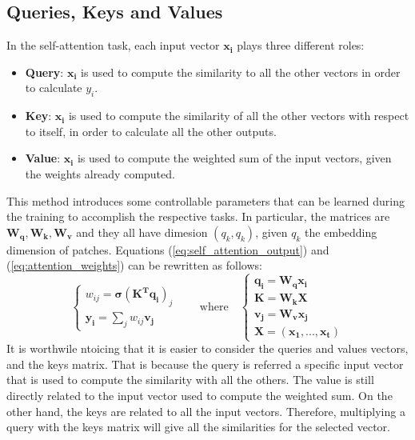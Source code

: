 \subsection{Queries, Keys and Values}
In the self-attention task, each input vector $\boldsymbol{x_i}$ plays three 
different roles:
\begin{itemize}
    \item \textbf{Query}: $\boldsymbol{x_i}$ is used to compute the similarity to all the other 
    vectors in order to calculate $y_i$.
    \item \textbf{Key}: $\boldsymbol{x_i}$ is used to compute the similarity of 
    all the other vectors with respect to itself, in order to calculate all the 
    other outputs.
    \item \textbf{Value}: $\boldsymbol{x_i}$ is used to compute the weighted sum 
    of the input vectors, given the weights already computed.
\end{itemize}
This method introduces some controllable parameters that can be learned during 
the training to accomplish the respective tasks. In particular, the matrices 
are $\boldsymbol{W_q}, \boldsymbol{W_k}, \boldsymbol{W_v}$ and they all have 
dimesion $(q_k, q_k)$, given $q_k$ the embedding dimension of patches.
Equations (\ref{eq:self_attention_output}) and (\ref{eq:attention_weights}) can 
be rewritten as follows:
\begin{equation}
\begin{cases}
    w_{ij} = \boldsymbol{\sigma}(\boldsymbol{K^T q_i})_j \\
    \boldsymbol{y_i} = \sum_j w_{ij} \boldsymbol{v_j}
\end{cases}
\qquad
\text{where}
\quad
\begin{cases}
    \boldsymbol{q_i} = \boldsymbol{W_q x_i} \\
    \boldsymbol{K} = \boldsymbol{W_k X} \\
    \boldsymbol{v_j} = \boldsymbol{W_v x_j} \\
    \boldsymbol{X} = (\boldsymbol{x_1}, ..., \boldsymbol{x_t})
\end{cases}
\label{eq:self_attention_qkv}
\end{equation}
It is worthwile ntoicing that it is easier to consider the queries and values 
vectors, and the keys matrix. That is because the query is referred a specific 
input vector that is used to compute the similarity with all the others. 
The value is still directly related to the input vector used to compute the 
weighted sum. On the other hand, the keys are related to all the input vectors. 
Therefore, multiplying a query with the keys matrix will give all the similarities 
for the selected vector.

